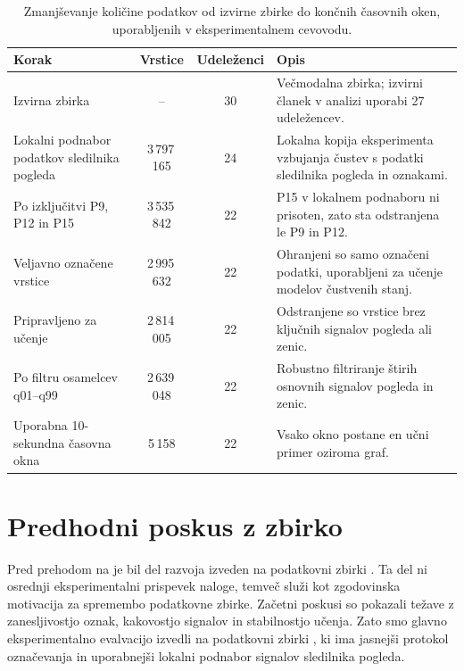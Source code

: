 \begin{table}[t]
    \centering
    \caption{Zmanjševanje količine podatkov od izvirne zbirke \MAHNOB{} do končnih časovnih oken, uporabljenih v eksperimentalnem cevovodu.}
    \label{tab:mahnob-predobdelava}
    \small
    \begin{tabularx}{\textwidth}{@{}>{\raggedright\arraybackslash}p{} c c >{\raggedright\arraybackslash}X@{}}
        \toprule
        Korak & Vrstice & Udeleženci & Opis \\
        \midrule
        Izvirna zbirka \MAHNOB{} & -- & 30 & Večmodalna zbirka; izvirni članek v analizi uporabi 27 udeležencev. \\
        Lokalni podnabor podatkov sledilnika pogleda & 3\,797\,165 & 24 & Lokalna kopija eksperimenta vzbujanja čustev s podatki sledilnika pogleda in oznakami. \\
        Po izključitvi P9, P12 in P15 & 3\,535\,842 & 22 & P15 v lokalnem podnaboru ni prisoten, zato sta odstranjena le P9 in P12. \\
        Veljavno označene vrstice & 2\,995\,632 & 22 & Ohranjeni so samo označeni podatki, uporabljeni za učenje modelov čustvenih stanj. \\
        Pripravljeno za učenje & 2\,814\,005 & 22 & Odstranjene so vrstice brez ključnih signalov pogleda ali zenic. \\
        Po filtru osamelcev q01--q99 & 2\,639\,048 & 22 & Robustno filtriranje štirih osnovnih signalov pogleda in zenic. \\
        Uporabna 10-sekundna časovna okna & 5\,158 & 22 & Vsako okno postane en učni primer oziroma graf. \\
        \bottomrule
    \end{tabularx}
\end{table}

\section{Predhodni poskus z zbirko \ESEED{}}
\label{subsec:eseed}

Pred prehodom na \MAHNOB{} je bil del razvoja izveden na podatkovni zbirki \ESEED{}.
Ta del ni osrednji eksperimentalni prispevek naloge, temveč služi kot zgodovinska motivacija za spremembo podatkovne zbirke.
Začetni poskusi so pokazali težave z zanesljivostjo oznak, kakovostjo signalov in stabilnostjo učenja.
Zato smo glavno eksperimentalno evalvacijo izvedli na podatkovni zbirki \MAHNOB{}, ki ima jasnejši protokol označevanja in uporabnejši lokalni podnabor signalov sledilnika pogleda.

